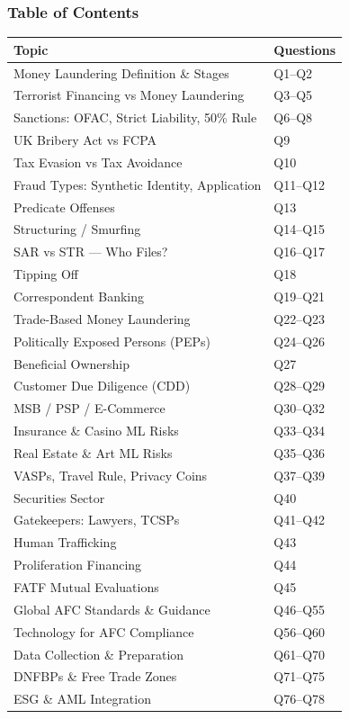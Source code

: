 \documentclass[12pt,aspectratio=169]{beamer}
\renewcommand{\scriptsize}{\fontsize{5}{6}\selectfont}
\renewcommand{\large}{\fontsize{9}{10}\selectfont}
\newcommand{\keypoint}[1]{\textcolor{deepblue}{\textbf{#1}}}
\begin{document}
	\begin{frame}
		\frametitle{\fontsize{13}{15}\selectfont \textbf{Table of Contents}}
		\vspace{0.2cm}
		\scriptsize
		\begin{longtable}{p{} p{}}
			\toprule
			\keypoint{\large Topic} & \keypoint{\large Questions} \\
			\midrule
			Money Laundering Definition \& Stages & Q1--Q2 \\
			Terrorist Financing vs Money Laundering & Q3--Q5 \\
			Sanctions: OFAC, Strict Liability, 50\% Rule & Q6--Q8 \\
			UK Bribery Act vs FCPA & Q9 \\
			Tax Evasion vs Tax Avoidance & Q10 \\
			Fraud Types: Synthetic Identity, Application & Q11--Q12 \\
			Predicate Offenses & Q13 \\
			Structuring / Smurfing & Q14--Q15 \\
			SAR vs STR — Who Files? & Q16--Q17 \\
			Tipping Off & Q18 \\
			Correspondent Banking & Q19--Q21 \\
			Trade-Based Money Laundering & Q22--Q23 \\
			Politically Exposed Persons (PEPs) & Q24--Q26 \\
			Beneficial Ownership & Q27 \\
			Customer Due Diligence (CDD) & Q28--Q29 \\
			MSB / PSP / E-Commerce & Q30--Q32 \\
			Insurance \& Casino ML Risks & Q33--Q34 \\
			Real Estate \& Art ML Risks & Q35--Q36 \\
			VASPs, Travel Rule, Privacy Coins & Q37--Q39 \\
			Securities Sector & Q40 \\
			Gatekeepers: Lawyers, TCSPs & Q41--Q42 \\
			Human Trafficking & Q43 \\
			Proliferation Financing & Q44 \\
			FATF Mutual Evaluations & Q45 \\
			Global AFC Standards \& Guidance & Q46--Q55 \\
			Technology for AFC Compliance & Q56--Q60 \\
			Data Collection \& Preparation & Q61--Q70 \\
			DNFBPs \& Free Trade Zones & Q71--Q75 \\
			ESG \& AML Integration & Q76--Q78 \\
			\bottomrule
		\end{longtable}
	\end{frame}
	
\end{document}
